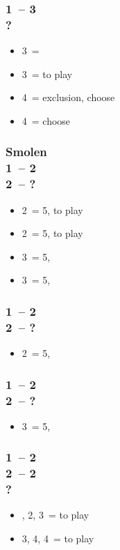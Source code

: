 \documentclass[12pt, a4paper]{article}
\begin{document}
\subsubsection*{1\ntx\ -- 3\hearts \\ ?}
\begin{itemize}
    \item 3\spades\ = \nat
    \item 3\nt\ = to play
    \item 4\hearts\ = exclusion, choose \minor
    \item 4\nt\ = choose \minor
\end{itemize}

\subsubsection*{Smolen \\
                1\ntx\ -- 2\clubs \\
                2\diams\ -- ?}
\begin{itemize}
    \item 2\hearts\ = 5\spades, to play
    \item 2\spades\ = 5\hearts, to play
    \item 3\hearts\ = 5\hearts, \gf
    \item 3\spades\ = 5\spades, \gf
\end{itemize}

\subsubsection*{1\ntx\ -- 2\diams \\
                2\hearts\ -- ?}
\begin{itemize}
    \item 2\spades\ = 5\spades, \inv
\end{itemize}

\subsubsection*{1\ntx\ -- 2\hearts \\
                2\spades\ -- ?}
\begin{itemize}
    \item 3\hearts\ = 5\hearts, \inv
\end{itemize}

\subsubsection*{1\ntx\ -- 2\diams \\
                2\hearts\ -- 2\spades \\
                ?}
\begin{itemize}
    \item \pass, 2\nt, 3\hearts\ = to play
    \item 3\nt, 4\hearts, 4\spades\ = to play
\end{itemize}
\end{document}
